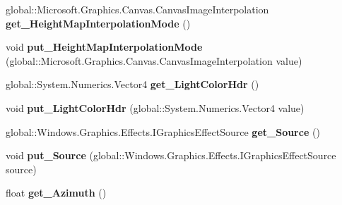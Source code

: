 \begin{DoxyCompactItemize}
global\+::\+Microsoft.\+Graphics.\+Canvas.\+Canvas\+Image\+Interpolation {\bfseries get\+\_\+\+Height\+Map\+Interpolation\+Mode} ()
\item 
\mbox{\label{interface_microsoft_1_1_graphics_1_1_canvas_1_1_effects_1_1_i_distant_specular_effect_a9a73beff7c6063c0808c4b7486fb5c80}} 
void {\bfseries put\+\_\+\+Height\+Map\+Interpolation\+Mode} (global\+::\+Microsoft.\+Graphics.\+Canvas.\+Canvas\+Image\+Interpolation value)
\item 
\mbox{\label{interface_microsoft_1_1_graphics_1_1_canvas_1_1_effects_1_1_i_distant_specular_effect_acf70c6c7ccebad1828a9e006410aaaa9}} 
global\+::\+System.\+Numerics.\+Vector4 {\bfseries get\+\_\+\+Light\+Color\+Hdr} ()
\item 
\mbox{\label{interface_microsoft_1_1_graphics_1_1_canvas_1_1_effects_1_1_i_distant_specular_effect_aac0c769cb8dbf6e69fceb0fb77241782}} 
void {\bfseries put\+\_\+\+Light\+Color\+Hdr} (global\+::\+System.\+Numerics.\+Vector4 value)
\item 
\mbox{\label{interface_microsoft_1_1_graphics_1_1_canvas_1_1_effects_1_1_i_distant_specular_effect_a87a9af882ea550892ab67d228de612ba}} 
global\+::\+Windows.\+Graphics.\+Effects.\+I\+Graphics\+Effect\+Source {\bfseries get\+\_\+\+Source} ()
\item 
\mbox{\label{interface_microsoft_1_1_graphics_1_1_canvas_1_1_effects_1_1_i_distant_specular_effect_a4f32a5fdd09ffbd96ece9a3279e3d004}} 
void {\bfseries put\+\_\+\+Source} (global\+::\+Windows.\+Graphics.\+Effects.\+I\+Graphics\+Effect\+Source source)
\item 
\mbox{\label{interface_microsoft_1_1_graphics_1_1_canvas_1_1_effects_1_1_i_distant_specular_effect_aff66a2bd547f08d9f056769803d13af2}} 
float {\bfseries get\+\_\+\+Azimuth} ()

\end{DoxyCompactItemize}
